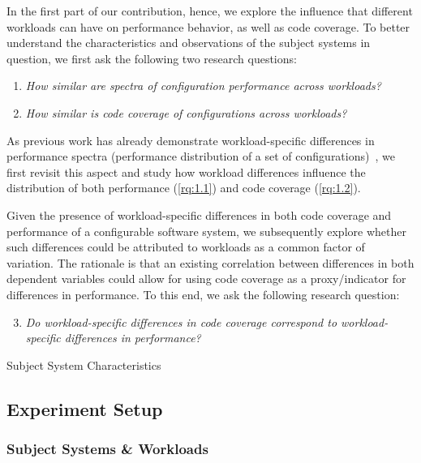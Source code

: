 In the first part of our contribution, hence, we explore the influence that different workloads can have on performance behavior, as well as code coverage. To better understand the characteristics and observations of the subject systems in question, we first ask the following two research questions:

\begin{enumerate}[align=left,label=RQ\,1.\arabic*,leftmargin=5.5em,labelwidth=5em]
	\raggedright
	\item\textit{How similar are spectra of configuration performance across workloads?}\label{rq:1.1}
	\item\textit{How similar is code coverage of configurations across workloads?}\label{rq:1.2}
\end{enumerate}

As previous work has already demonstrate workload-specific differences in performance spectra (performance distribution of a set of configurations)~\cite{alves_sampling_2020}, we first revisit this aspect and study how workload differences influence the distribution of both performance (\ref{rq:1.1}) and code coverage (\ref{rq:1.2}).

{\color{teal}Given the presence of workload-specific differences in both code coverage and performance of a configurable software system}, we subsequently explore whether such differences could be attributed to workloads as a common factor of variation. The rationale is that an existing correlation between differences in both dependent variables could allow for using code coverage as a proxy/indicator for differences in performance. To this end, we ask the following research question:
\begin{enumerate}[align=left,label=RQ\,1.\arabic*,leftmargin=5.5em,labelwidth=5em]
	\setcounter{enumi}{2}
	\item\textit{Do workload-specific differences in code coverage correspond to workload-specific differences in performance?}\label{rq:1.3}
\end{enumerate}

\begin{table*}[ht!]
	\centering
	\caption{Subject System Characteristics}
	
	\label{tab:subject_systems}
\end{table*}
\clearpage
\subsection{Experiment Setup}
\subsubsection{Subject Systems \& Workloads}

